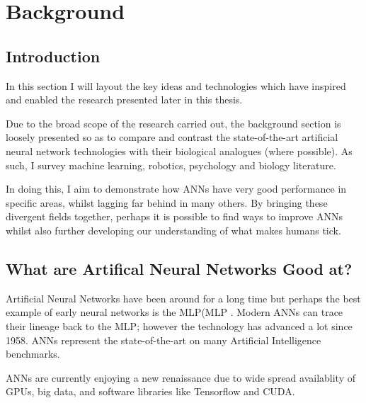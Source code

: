 
\chapter{Background} %

\label{Chapter3} %



\section{Introduction}\label{Lit:Intro}
In this section I will layout the key ideas and technologies which have inspired and enabled the research presented later in this thesis.

Due to the broad scope of the research carried out, the background section is loosely presented so as to compare and contrast the state-of-the-art artificial neural network technologies with their biological analogues (where possible). As such, I survey machine learning, robotics, psychology and biology literature.

In doing this, I aim to demonstrate how \acp{ANN} have very good performance in specific areas, whilst lagging far behind in many others. By bringing these divergent fields together, perhaps it is possible to find ways to improve \acp{ANN} whilst also further developing our understanding of what makes humans tick. 


\section{What are Artifical Neural Networks Good at?}
Artificial Neural Networks have been around for a long time but perhaps the best example of early neural networks is the \acl{MLP}(\ac{MLP} \cite{rosenblatt1958perceptron}. Modern \acp{ANN} can trace their lineage back to the \ac{MLP}; however the technology has advanced a lot since 1958. \acp{ANN} represent the state-of-the-art on many Artificial Intelligence benchmarks.

\acp{ANN} are currently enjoying a new renaissance due to wide spread availablity of \acp{GPU}, big data, and software libraries like Tensorflow and CUDA.

